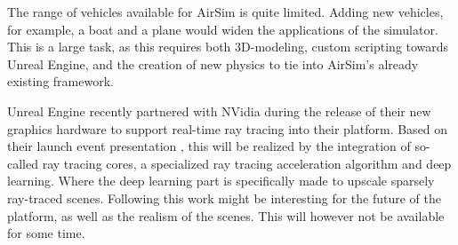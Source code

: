 The range of vehicles available for AirSim is quite limited. Adding new vehicles, for example, a boat and a plane would widen the applications of the simulator. This is a large task, as this requires both 3D-modeling, custom scripting towards Unreal Engine, and the creation of new physics to tie into AirSim's already existing framework.

Unreal Engine recently partnered with NVidia during the release of their new graphics hardware to support real-time ray tracing into their platform. Based on their launch event presentation \cite{NvidiaConference}, this will be realized by the integration of so-called ray tracing cores, a specialized ray tracing acceleration algorithm and deep learning. Where the deep learning part is specifically made to upscale sparsely ray-traced scenes. Following this work might be interesting for the future of the platform, as well as the realism of the scenes. This will however not be available for some time.



\cleardoublepage







